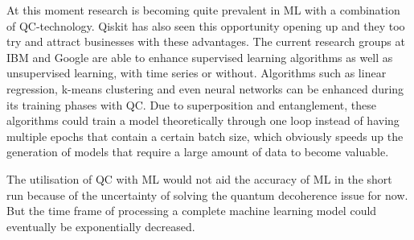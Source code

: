 At this moment research is becoming quite prevalent in ML with a combination of QC-technology. Qiskit has also seen this opportunity opening up and they too try and attract businesses with these advantages. The current research groups at IBM and Google are able to enhance supervised learning algorithms as well as unsupervised learning, with time series or without. Algorithms such as linear regression, k-means clustering and even neural networks can be enhanced during its training phases with QC. Due to superposition and entanglement, these algorithms could train a model theoretically through one loop instead of having multiple epochs that contain a certain batch size, which obviously speeds up the generation of models that require a large amount of data to become valuable.

The utilisation of QC with ML would not aid the accuracy of ML in the short run because of the uncertainty of solving the quantum decoherence issue for now. But the time frame of processing a complete machine learning model could eventually be exponentially decreased.





